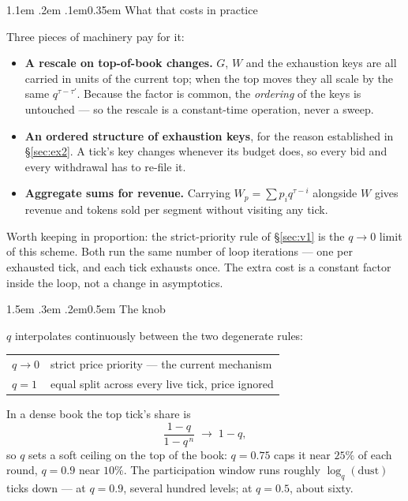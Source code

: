 \documentclass[11pt]{article}
\makeatletter
\renewcommand\section{\@startsection{section}{1}{\z@}%
  {1.5em \@plus .3em \@minus .2em}{0.5em}%
  {\sffamily\large\bfseries\color{accent}}}
\renewcommand\subsection{\@startsection{subsection}{2}{\z@}%
  {1.1em \@plus .2em \@minus .1em}{0.35em}%
  {\sffamily\normalsize\bfseries\color{ink}}}
\makeatother
\begin{document}
\subsection{What that costs in practice}

Three pieces of machinery pay for it:

\begin{itemize}\setlength\itemsep{3pt}
\item \textbf{A rescale on top-of-book changes.} $G$, $W$ and the exhaustion keys are all
      carried in units of the current top; when the top moves they all scale by the same
      $q^{\tau-\tau'}$. Because the factor is common, the \emph{ordering} of the keys is
      untouched — so the rescale is a constant-time operation, never a sweep.
\item \textbf{An ordered structure of exhaustion keys}, for the reason established in
      \S\ref{sec:ex2}. A tick's key changes whenever its budget does, so every bid and every
      withdrawal has to re-file it.
\item \textbf{Aggregate sums for revenue.} Carrying $W_p=\sum p_i q^{\tau-i}$ alongside $W$
      gives revenue and tokens sold per segment without visiting any tick.
\end{itemize}

Worth keeping in proportion: the strict-priority rule of \S\ref{sec:v1} is the $q\to0$ limit of
this scheme. Both run the same number of loop iterations — one per exhausted tick, and each
tick exhausts once. The extra cost is a constant factor inside the loop, not a change in
asymptotics.

\section{The knob}

$q$ interpolates continuously between the two degenerate rules:

\begin{center}
\begin{tabular}{ll}
\toprule
$q \to 0$ & strict price priority — the current mechanism \\
$q = 1$   & equal split across every live tick, price ignored \\
\bottomrule
\end{tabular}
\end{center}

In a dense book the top tick's share is
\[
  \frac{1-q}{1-q^{\,n}} \;\longrightarrow\; 1-q ,
\]
so $q$ sets a soft ceiling on the top of the book: $q=0.75$ caps it near $25\%$ of each round,
$q=0.9$ near $10\%$. The participation window runs roughly $\log_q(\text{dust})$ ticks down —
at $q=0.9$, several hundred levels; at $q=0.5$, about sixty.
\end{document}
